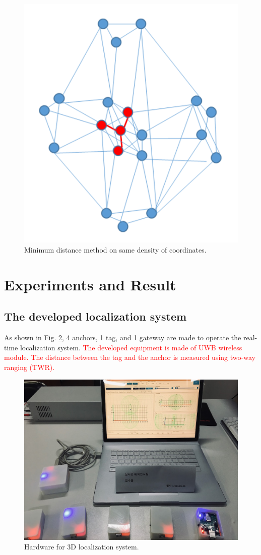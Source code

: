 \documentclass[conference]{IEEEtran}
\begin{document}
\begin{figure}[htbp]
    \centerline{\includegraphics[width=0.62\columnwidth]{fig4.png}}
    \caption{Minimum distance method on same density of coordinates.}
    \label{fig4}
\end{figure}

\section{Experiments and Result}
\subsection{The developed localization system}

As shown in Fig. \ref{fig10}, 4 anchors, 1 tag, and 1 gateway are made to operate the real-time localization system. \textcolor{red}{The developed equipment is made of UWB wireless module. The distance between the tag and the anchor is measured using two-way ranging (TWR).}

\begin{figure}[htbp]
    \centerline{\includegraphics[width=0.62\columnwidth]{fig10.jpg}}
    \caption{Hardware for 3D localization system.}
    \label{fig10}
\end{figure}
\end{document}
